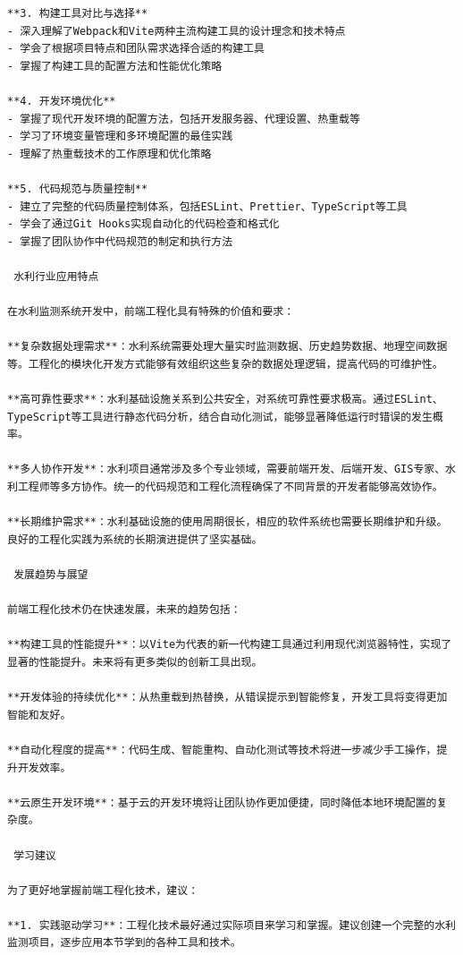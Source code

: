 {{\begin{lstlisting}
**3. 构建工具对比与选择**
- 深入理解了Webpack和Vite两种主流构建工具的设计理念和技术特点
- 学会了根据项目特点和团队需求选择合适的构建工具
- 掌握了构建工具的配置方法和性能优化策略

**4. 开发环境优化**
- 掌握了现代开发环境的配置方法，包括开发服务器、代理设置、热重载等
- 学习了环境变量管理和多环境配置的最佳实践
- 理解了热重载技术的工作原理和优化策略

**5. 代码规范与质量控制**
- 建立了完整的代码质量控制体系，包括ESLint、Prettier、TypeScript等工具
- 学会了通过Git Hooks实现自动化的代码检查和格式化
- 掌握了团队协作中代码规范的制定和执行方法

 水利行业应用特点

在水利监测系统开发中，前端工程化具有特殊的价值和要求：

**复杂数据处理需求**：水利系统需要处理大量实时监测数据、历史趋势数据、地理空间数据等。工程化的模块化开发方式能够有效组织这些复杂的数据处理逻辑，提高代码的可维护性。

**高可靠性要求**：水利基础设施关系到公共安全，对系统可靠性要求极高。通过ESLint、TypeScript等工具进行静态代码分析，结合自动化测试，能够显著降低运行时错误的发生概率。

**多人协作开发**：水利项目通常涉及多个专业领域，需要前端开发、后端开发、GIS专家、水利工程师等多方协作。统一的代码规范和工程化流程确保了不同背景的开发者能够高效协作。

**长期维护需求**：水利基础设施的使用周期很长，相应的软件系统也需要长期维护和升级。良好的工程化实践为系统的长期演进提供了坚实基础。

 发展趋势与展望

前端工程化技术仍在快速发展，未来的趋势包括：

**构建工具的性能提升**：以Vite为代表的新一代构建工具通过利用现代浏览器特性，实现了显著的性能提升。未来将有更多类似的创新工具出现。

**开发体验的持续优化**：从热重载到热替换，从错误提示到智能修复，开发工具将变得更加智能和友好。

**自动化程度的提高**：代码生成、智能重构、自动化测试等技术将进一步减少手工操作，提升开发效率。

**云原生开发环境**：基于云的开发环境将让团队协作更加便捷，同时降低本地环境配置的复杂度。

 学习建议

为了更好地掌握前端工程化技术，建议：

**1. 实践驱动学习**：工程化技术最好通过实际项目来学习和掌握。建议创建一个完整的水利监测项目，逐步应用本节学到的各种工具和技术。


\end{lstlisting}}}
